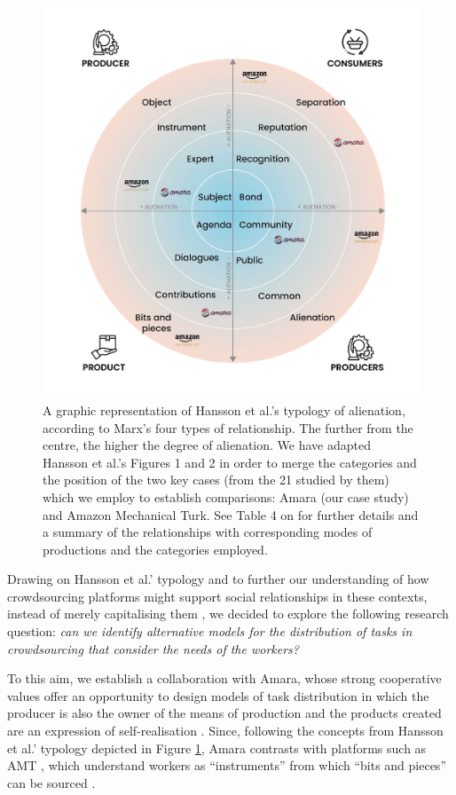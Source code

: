 \begin{figure}[t]
    \centering
    \includegraphics[width=.65\textwidth,height=.5\textheight]{figures/diagrama_02.jpg}
    \caption{A graphic representation of Hansson et al.’s \cite{hansson_capitalizing_2018} typology of alienation, according to Marx’s \cite{10.2307/2550890} four types of relationship. The further from the centre, the higher the degree of alienation. We have adapted Hansson et al.’s \cite{hansson_capitalizing_2018} Figures 1 and 2 in order to merge the categories and the position of the two key cases (from the 21 studied by them) which we employ to establish comparisons: Amara (our case study) and Amazon Mechanical Turk. See Table 4 on \cite{hansson_capitalizing_2018} for further details and a summary of the relationships with corresponding modes of productions and the categories employed.}
    \label{fig:hansson_adapted}
\end{figure}

Drawing on Hansson et al.' typology \cite{hansson_capitalizing_2018} and to further our understanding of how crowdsourcing platforms might support social relationships in these contexts, instead of merely capitalising them \cite{hansson_capitalizing_2018}, we decided to explore the following research question: \textit{can we identify alternative models for the distribution of tasks in crowdsourcing that consider the needs of the workers?}

To this aim, we establish a collaboration with Amara, whose strong cooperative values \cite{gray2019ghost} offer an opportunity to design models of task distribution in which the producer is also the owner of the means of production and the products created are an expression of self-realisation \cite{hansson_capitalizing_2018}. Since, following the concepts from Hansson et al.' typology \cite{hansson_capitalizing_2018} depicted in Figure \ref{fig:hansson_adapted}, Amara contrasts with platforms such as AMT \cite{gray2019ghost}, which understand workers as ``instruments'' from which ``bits and pieces'' can be sourced \cite{hansson_capitalizing_2018}. 

